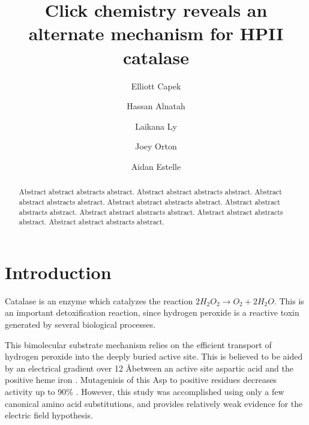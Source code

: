 \documentclass[journal=jacsat,manuscript=article]{achemso}
\author{Elliott Capek}
\affiliation{Department of Biochemistry, Oregon State University}
\author{Hassan Alnatah}
\author{Laikana Ly}
\author{Joey Orton}
\author{Aidan Estelle}
\title[]{Click chemistry reveals an alternate mechanism for HPII catalase}
\begin{document}
\begin{abstract}

  Abstract abstract abstracts abstract. Abstract abstract abstracts abstract. Abstract abstract abstracts abstract. Abstract abstract abstracts abstract. Abstract abstract abstracts abstract. Abstract abstract abstracts abstract. Abstract abstract abstracts abstract. Abstract abstract abstracts abstract.\\
\end{abstract}

\section{Introduction}
Catalase is an enzyme which catalyzes the reaction $2H_2O_2 \rightarrow O_2 + 2H_2O$. This is an important detoxification reaction, since hydrogen peroxide is a reactive toxin generated by several biological processes. 

This bimolecular substrate mechanism relies on the efficient transport of hydrogen peroxide into the deeply buried active site. This is believed to be aided by an electrical gradient over 12 \AA between an active site aspartic acid and the positive heme iron \cite{chelikani}. Mutagenisis of this Asp to positive residues decreases activity up to 90\% \cite{chelikani}. However, this study was accomplished using only a few canonical amino acid substitutions, and provides relatively weak evidence for the electric field hypothesis.
\end{document}

